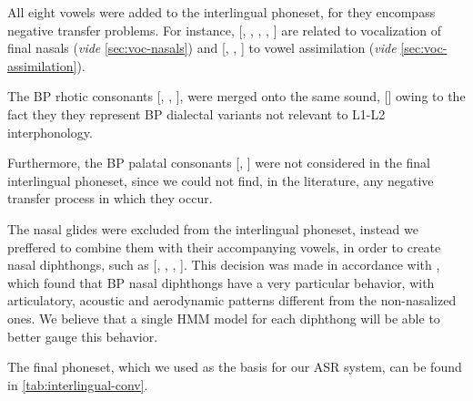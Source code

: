 All eight vowels were added to the interlingual phoneset, for they encompass negative transfer problems. For instance, 
[, , , , ] are related to
vocalization of final nasals (\emph{vide} \ref{sec:voc-nasals}) and [, , ] to vowel assimilation (\emph{vide} \ref{sec:voc-assimilation}).

The \ac{BP} rhotic consonants [, , ], were merged onto the same sound, [] owing to the fact
they they represent \ac{BP} dialectal variants not relevant to L1-L2 interphonology.

Furthermore, the \ac{BP} palatal consonants [\textipa{\textltailn}, ] were not considered in the final interlingual phoneset,
since we could not find, in the literature, any negative transfer process in which they occur. 

The nasal glides were excluded from the interlingual phoneset, instead we preffered to combine them with their accompanying vowels, in
order to create nasal diphthongs, such as [, , , ]. This decision was 
made in accordance with \cite{Demasi2010}, which found that \ac{BP} nasal diphthongs have a very particular behavior, with 
articulatory, acoustic and aerodynamic patterns different from the non-nasalized ones. 
We believe that a single \ac{HMM} model for each diphthong will be able to better gauge this behavior.

The final phoneset, which we used as the basis for our \ac{ASR} system, can be found in \autoref{tab:interlingual-conv}.

\renewcommand{\arraystretch}{0.6}%

